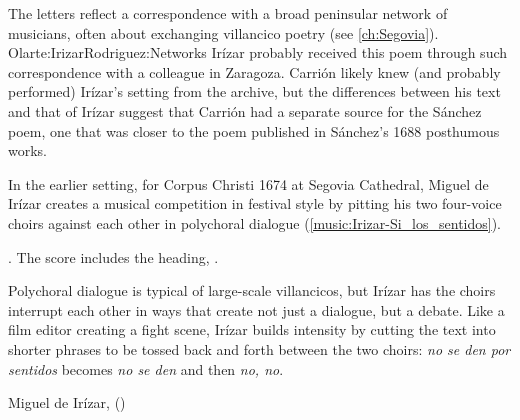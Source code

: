 The letters reflect a correspondence with a broad peninsular network of
musicians, often about exchanging villancico poetry (see \cref{ch:Segovia}).%
    \Autocite{LopezCalo:IrizarLetters1}{Olarte:Irizar}{Rodriguez:Networks}
Irízar probably received this poem through such correspondence with a colleague
in Zaragoza.
Carrión likely knew (and probably performed) Irízar's setting from the archive,
but the differences between his text and that of Irízar suggest that Carrión had
a separate source for the Sánchez poem, one that was closer to the poem
published in Sánchez's 1688 posthumous works.%
    \Autocite[171--172]{Sanchez:LiraPoetica}

In the earlier setting, for Corpus Christi 1674 at Segovia Cathedral, Miguel de
Irízar creates a musical competition in festival style by pitting his two
four-voice choirs against each other in polychoral dialogue
(\cref{music:Irizar-Si_los_sentidos}).%
\begin{Footnote}
    \Autocite[133--148]{Cashner:WLSCM32}.  
    The score includes the heading, .
\end{Footnote}
Polychoral dialogue is typical of large-scale villancicos, but Irízar has the
choirs interrupt each other in ways that create not just a dialogue, but a
debate.
Like a film editor creating a fight scene, Irízar builds intensity by cutting
the text into shorter phrases to be tossed back and forth between the two
choirs: \emph{no se den por sentidos} becomes \emph{no se den} and then
\emph{no, no}.

\begin{musicexample}
    \caption{Miguel de Irízar,  ()}

    \label{music:Irizar-Si_los_sentidos}

\end{musicexample}


